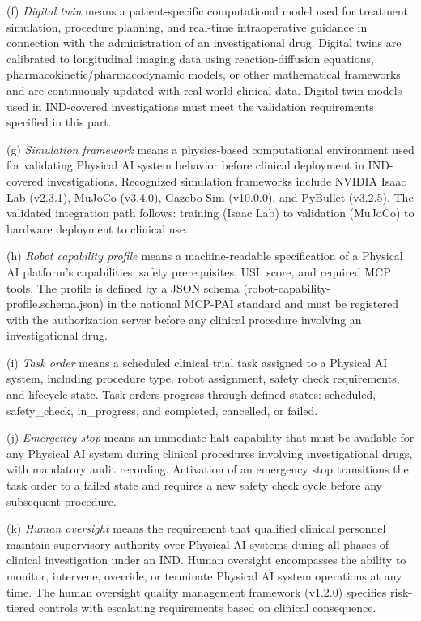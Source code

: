 \documentclass[11pt]{article}
\begin{document}
(f) \textit{Digital twin} means a patient-specific computational model used for treatment simulation, procedure planning, and real-time intraoperative guidance in connection with the administration of an investigational drug. Digital twins are calibrated to longitudinal imaging data using reaction-diffusion equations, pharmacokinetic/pharmacodynamic models, or other mathematical frameworks and are continuously updated with real-world clinical data. Digital twin models used in IND-covered investigations must meet the validation requirements specified in this part.

(g) \textit{Simulation framework} means a physics-based computational environment used for validating Physical AI system behavior before clinical deployment in IND-covered investigations. Recognized simulation frameworks include NVIDIA Isaac Lab (v2.3.1), MuJoCo (v3.4.0), Gazebo Sim (v10.0.0), and PyBullet (v3.2.5). The validated integration path follows: training (Isaac Lab) to validation (MuJoCo) to hardware deployment to clinical use.

(h) \textit{Robot capability profile} means a machine-readable specification of a Physical AI platform's capabilities, safety prerequisites, USL score, and required MCP tools. The profile is defined by a JSON schema (robot-capability-profile.schema.json) in the national MCP-PAI standard and must be registered with the authorization server before any clinical procedure involving an investigational drug.

(i) \textit{Task order} means a scheduled clinical trial task assigned to a Physical AI system, including procedure type, robot assignment, safety check requirements, and lifecycle state. Task orders progress through defined states: scheduled, safety\_check, in\_progress, and completed, cancelled, or failed.

(j) \textit{Emergency stop} means an immediate halt capability that must be available for any Physical AI system during clinical procedures involving investigational drugs, with mandatory audit recording. Activation of an emergency stop transitions the task order to a failed state and requires a new safety check cycle before any subsequent procedure.

(k) \textit{Human oversight} means the requirement that qualified clinical personnel maintain supervisory authority over Physical AI systems during all phases of clinical investigation under an IND. Human oversight encompasses the ability to monitor, intervene, override, or terminate Physical AI system operations at any time. The human oversight quality management framework (v1.2.0) specifies risk-tiered controls with escalating requirements based on clinical consequence.
\end{document}
